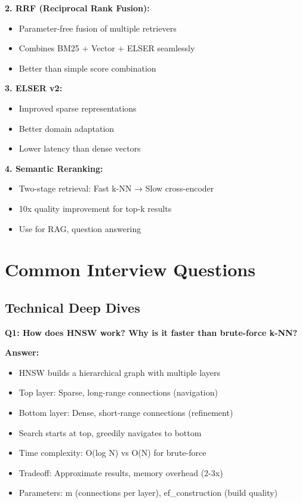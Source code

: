 \documentclass[10pt]{article}
\begin{document}
\textbf{2. RRF (Reciprocal Rank Fusion):}
\begin{itemize}
\item Parameter-free fusion of multiple retrievers
\item Combines BM25 + Vector + ELSER seamlessly
\item Better than simple score combination
\end{itemize}

\textbf{3. ELSER v2:}
\begin{itemize}
\item Improved sparse representations
\item Better domain adaptation
\item Lower latency than dense vectors
\end{itemize}

\textbf{4. Semantic Reranking:}
\begin{itemize}
\item Two-stage retrieval: Fast k-NN → Slow cross-encoder
\item 10x quality improvement for top-k results
\item Use for RAG, question answering
\end{itemize}

\section{Common Interview Questions}

\subsection{Technical Deep Dives}

\textbf{Q1: How does HNSW work? Why is it faster than brute-force k-NN?}

\textbf{Answer:}
\begin{itemize}
\item HNSW builds a hierarchical graph with multiple layers
\item Top layer: Sparse, long-range connections (navigation)
\item Bottom layer: Dense, short-range connections (refinement)
\item Search starts at top, greedily navigates to bottom
\item Time complexity: O(log N) vs O(N) for brute-force
\item Tradeoff: Approximate results, memory overhead (2-3x)
\item Parameters: m (connections per layer), ef\_construction (build quality)
\end{itemize}
\end{document}
